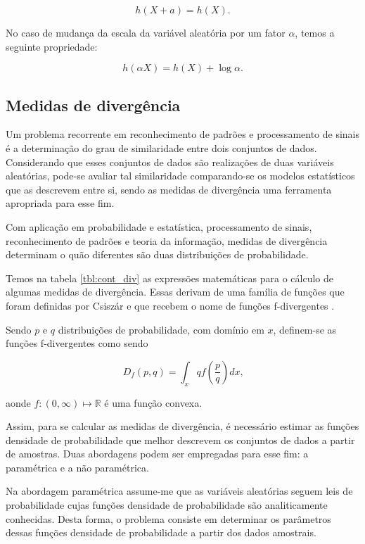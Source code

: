 \begin{equation}
h(X+a) = h(X)\text{.}
\end{equation}

No caso de mudança da escala da variável aleatória por um fator $\alpha$, temos a seguinte propriedade:

\begin{equation}\label{eq:escala_entropia}
h(\alpha X) = h(X) + \log{\alpha}\text{.}
\end{equation}

\subsection{Medidas de divergência}

Um problema recorrente em reconhecimento de padrões e processamento de sinais é a determinação do grau de similaridade entre dois conjuntos de dados. Considerando que esses conjuntos de dados são realizações de duas variáveis aleatórias, pode-se avaliar tal similaridade comparando-se os modelos estatísticos que as descrevem entre si, sendo as medidas de divergência uma ferramenta apropriada para esse fim. 

Com aplicação em probabilidade e estatística, processamento de sinais, reconhecimento de padrões e teoria da informação, medidas de divergência determinam o quão diferentes são duas distribuições de probabilidade. 

Temos na tabela \ref{tbl:cont_div} as expressões matemáticas para o cálculo de algumas medidas de divergência. Essas derivam de uma família de funções que foram definidas por Csiszár e que recebem o nome de funções f-divergentes \cite{1999880}. 

Sendo $p$ e $q$ distribuições de probabilidade, com domínio em $x$, definem-se as funções f-divergentes como sendo

\begin{equation}
D_f(p,q) = \int_xqf(\frac{p}{q})dx\text{,}
\end{equation}

aonde $f:(0,\infty)\mapsto\mathbb{R}$ é uma função convexa.


Assim, para se calcular as medidas de divergência, é necessário estimar as funções densidade de probabilidade que melhor descrevem os conjuntos de dados a partir de amostras. Duas abordagens podem ser empregadas para esse fim: a paramétrica e a não paramétrica.

Na abordagem paramétrica assume-me que as variáveis aleatórias seguem leis de probabilidade cujas funções densidade de probabilidade são analiticamente conhecidas. Desta forma, o problema consiste em determinar os parâmetros dessas funções densidade de probabilidade a partir dos dados amostrais. 

